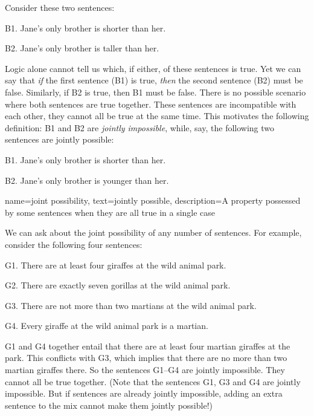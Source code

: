 Consider these two sentences:
	\begin{ebullet}
		\item[B1.] Jane's only brother is shorter than her.
		\item[B2.] Jane's only brother is taller than her.
	\end{ebullet}
Logic alone cannot tell us which, if either, of these sentences is true. Yet we can say that \emph{if} the first sentence (B1) is true, \emph{then} the second sentence (B2) must be false. Similarly, if B2 is true, then B1 must be false. There is no possible scenario where both sentences are true together. These sentences are incompatible with each other, they cannot all be true at the same time. This motivates the following definition:
B1 and B2 are \emph{jointly impossible}, while, say, the following two sentences are jointly possible:
	\begin{ebullet}
		\item[B1.] Jane's only brother is shorter than her.
		\item[B2.] Jane's only brother is younger than her.
	\end{ebullet}

{
name=joint possibility,
text={jointly possible},
description={A property possessed by some sentences when they are all true in a single case}
}

We can ask about the joint possibility of any number of sentences. For example, consider the following four sentences:
	\begin{ebullet}
		\item[G1.] \label{MartianGiraffes} There are at least four giraffes at the wild animal park.
		\item[G2.] There are exactly seven gorillas at the wild animal park.
		\item[G3.] There are not more than two martians at the wild animal park.
		\item[G4.] Every giraffe at the wild animal park is a martian.
	\end{ebullet}
G1 and G4 together entail that there are at least four martian giraffes at the park. This conflicts with G3, which implies that there are no more than two martian giraffes there. So the sentences G1--G4 are jointly impossible. They cannot all be true together. (Note that the sentences G1, G3 and G4 are jointly impossible. But if sentences are already jointly impossible, adding an extra sentence to the mix cannot make them jointly possible!)

